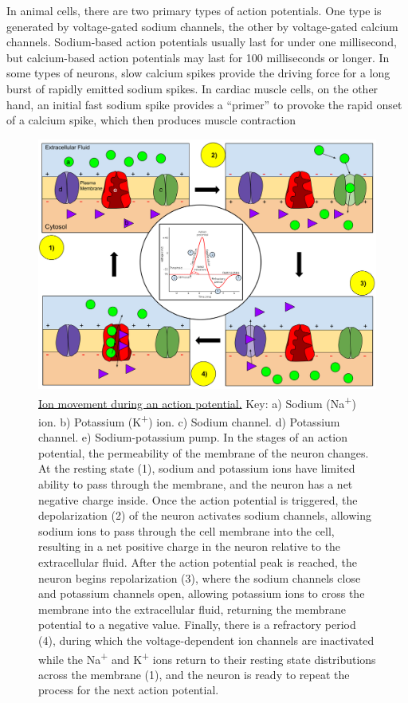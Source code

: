 In animal cells, there are two primary types of action potentials. One type is generated by voltage-gated sodium channels, the other by voltage-gated calcium channels. Sodium-based action potentials usually last for under one millisecond, but calcium-based action potentials may last for 100 milliseconds or longer. In some types of neurons, slow calcium spikes provide the driving force for a long burst of rapidly emitted sodium spikes. In cardiac muscle cells, on the other hand, an initial fast sodium spike provides a ``primer'' to provoke the rapid onset of a calcium spike, which then produces muscle contraction



\begin{figure}

{\centering \includegraphics[width=0.7\linewidth]{./figures/potential/ActionPotential} 

}

\caption{\href{https://commons.wikimedia.org/wiki/File:Membrane_Permeability_of_a_Neuron_During_an_Action_Potential.svg}{Ion movement during an action potential.} Key: a) Sodium (Na\textsuperscript{+}) ion. b) Potassium (K\textsuperscript{+}) ion. c) Sodium channel. d) Potassium channel. e) Sodium-potassium pump. In the stages of an action potential, the permeability of the membrane of the neuron changes. At the resting state (1), sodium and potassium ions have limited ability to pass through the membrane, and the neuron has a net negative charge inside. Once the action potential is triggered, the depolarization (2) of the neuron activates sodium channels, allowing sodium ions to pass through the cell membrane into the cell, resulting in a net positive charge in the neuron relative to the extracellular fluid. After the action potential peak is reached, the neuron begins repolarization (3), where the sodium channels close and potassium channels open, allowing potassium ions to cross the membrane into the extracellular fluid, returning the membrane potential to a negative value. Finally, there is a refractory period (4), during which the voltage-dependent ion channels are inactivated while the Na\textsuperscript{+} and K\textsuperscript{+} ions return to their resting state distributions across the membrane (1), and the neuron is ready to repeat the process for the next action potential.}\label{fig:actionpotential}
\end{figure}

